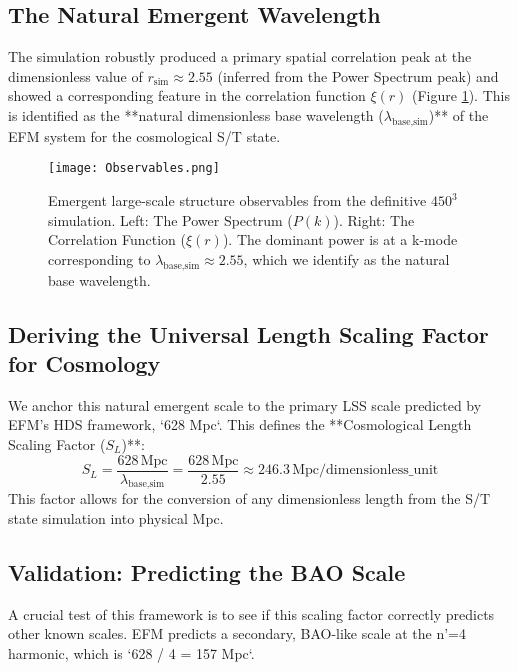 \documentclass[11pt]{article}
\begin{document}
\subsection{The Natural Emergent Wavelength}
The simulation robustly produced a primary spatial correlation peak at the dimensionless value of $r_{\text{sim}} \approx 2.55$ (inferred from the Power Spectrum peak) and showed a corresponding feature in the correlation function $\xi(r)$ (Figure \ref{fig:lss_observables}). This is identified as the **natural dimensionless base wavelength ($\lambda_{\text{base,sim}}$)** of the EFM system for the cosmological S/T state.

\begin{figure}[h!]
\centering
\texttt{[image: Observables.png]} 
\caption{Emergent large-scale structure observables from the definitive $450^3$ simulation. Left: The Power Spectrum ($P(k)$). Right: The Correlation Function ($\xi(r)$). The dominant power is at a k-mode corresponding to $\lambda_{\text{base,sim}} \approx 2.55$, which we identify as the natural base wavelength.}
\label{fig:lss_observables}
\end{figure}

\subsection{Deriving the Universal Length Scaling Factor for Cosmology}
We anchor this natural emergent scale to the primary LSS scale predicted by EFM's HDS framework, `628 Mpc`. This defines the **Cosmological Length Scaling Factor ($S_L$)**:
\begin{equation}
S_L = \frac{628 \, \text{Mpc}}{\lambda_{\text{base,sim}}} = \frac{628 \, \text{Mpc}}{2.55} \approx 246.3 \, \text{Mpc/dimensionless\_unit}
\end{equation}
This factor allows for the conversion of any dimensionless length from the S/T state simulation into physical Mpc.

\subsection{Validation: Predicting the BAO Scale}
A crucial test of this framework is to see if this scaling factor correctly predicts other known scales. EFM predicts a secondary, BAO-like scale at the n'=4 harmonic, which is `628 / 4 = 157 Mpc`.
\end{document}
